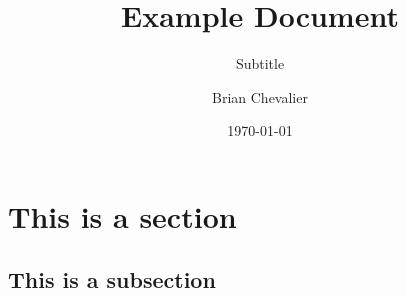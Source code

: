 \documentclass{KDHnotes}
\author{Brian Chevalier}
\date{\today}
\title{Example Document}
\subtitle{Subtitle}
\begin{document}
\maketitle %

\section{This is a section}

\subsection{This is a subsection}

\end{document}
